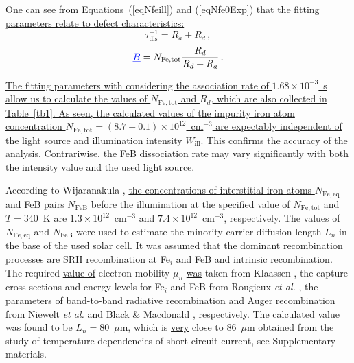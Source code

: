 \documentclass{WileyMSP-template}
\begin{document}
\textcolor[rgb]{0.00,0.07,1.00}{\uline{One can see from Equations~(\ref{eqNfeill}) and (\ref{eqNfe0Exp}) that
the fitting parameters relate to defect characteristics:}}
\begin{equation}
\label{eqTauRd}
\tau_\mathrm{dis}^{-1}=R_a+R_d\,,
\end{equation}
\begin{equation}
\label{eqFefit}
\textcolor[rgb]{0.00,0.07,1.00}{\uline{B}}=N_\mathrm{Fe,tot}\frac{R_d}{R_d+R_a}\,.
\end{equation}

\textcolor[rgb]{0.00,0.07,1.00}{\uline{The fitting parameters
with considering the association rate of $1.68\times10^{-3}$~s allow us
to calculate the values of $N_\mathrm{Fe,tot}$ and $R_d$, which are also collected in Table~\ref{tb1}.
As seen, the calculated values of the impurity iron atom concentration
$N_\mathrm{Fe,tot}=(8.7\pm0.1)\times10^{12}$~cm$^{-3}$ are expectably independent of the light source and illumination intensity $W_\mathrm{ill}$.
This confirms }}the accuracy of the analysis.
Contrariwise, the FeB dissociation rate may vary significantly with both the intensity value and the used light source.

According to Wijaranakula \cite{FeB:kinetic}, \textcolor[rgb]{0.00,0.07,1.00}{\uline{the concentrations of interstitial iron atoms $N_\mathrm{Fe,eq}$ and FeB pairs
$N_\mathrm{FeB}$ before the illumination at the specified value}} of $N_\mathrm{Fe,tot}$ and $T=340$~K are $1.3\times10^{12}$~cm$^{-3}$ and $7.4\times10^{12}$~cm$^{-3}$, respectively.
The values of $N_\mathrm{Fe,eq}$ and $N_\mathrm{FeB}$ were used to estimate the minority carrier diffusion length $L_n$
in the base of the used solar cell.
It was assumed that the dominant recombination processes are SRH recombination at Fe$_i$ and FeB and intrinsic recombination.
The required \textcolor[rgb]{0.00,0.07,1.00}{\uline{value of}} electron mobility $\mu_n$ \textcolor[rgb]{0.00,0.07,1.00}{\uline{was}} taken from Klaassen \cite{KLAASSEN953},
the capture cross sections and energy levels for Fe$_i$ and FeB from Rougieux \emph{et al.} \cite{ROUGIEUX2018},
the \textcolor[rgb]{0.00,0.07,1.00}{\uline{parameters}} of band-to-band radiative recombination and Auger recombination from
Niewelt \emph{et al.} \cite{Brad2022} and Black \& Macdonald \cite{AugerSi2022}, respectively.
The calculated value was found to be $L_n=80$~$\mu$m,
which is \textcolor[rgb]{0.00,0.07,1.00}{\uline{very}} close to 86~$\mu$m  obtained from the study of temperature dependencies of short-circuit current, see Supplementary materials.
\end{document}
